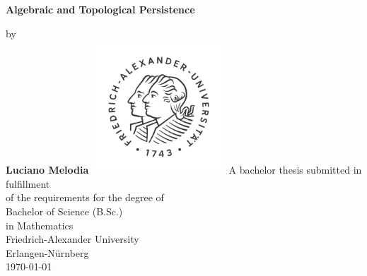 \begin{titlepage}
    \begin{center}
        \vspace*{1cm}
        \Huge
        \textbf{Algebraic and Topological Persistence}
        \vspace{1cm}
        \Large
                
        by\\
        \textbf{Luciano Melodia}
        \vfill
        \includegraphics[width=5cm]{images/fau.png}
        \vfill
        A bachelor thesis submitted in fulfillment\\
        of the requirements for the degree of\\
        Bachelor of Science (B.Sc.)\\
        in Mathematics\\ 
        \vspace{1.5cm}
        \large
        Friedrich-Alexander University\\
        Erlangen-Nürnberg\\
        \today
    \end{center}
\end{titlepage}